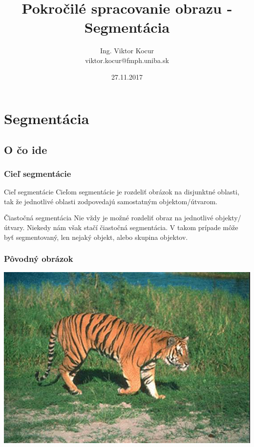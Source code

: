 \documentclass{beamer}
\title[10. cvičenie]{Pokročilé spracovanie obrazu - Segmentácia}
\author[Kocur]{Ing. Viktor Kocur \\{\small viktor.kocur@fmph.uniba.sk}}
\institute{DAI FMFI UK}
\date{27.11.2017}
\begin{document}


\begin{frame}

  \titlepage

\end{frame}

\section{Segmentácia}
\subsection{O čo ide}

\begin{frame}
\frametitle{Cieľ segmentácie}
\begin{block}{Cieľ segmentácie}
Cieľom segmentácie je rozdeliť obrázok na disjunktné oblasti, tak že jednotlivé oblasti zodpovedajú samostatným objektom/útvarom.
\end{block}

\begin{block}{Čiastočná segmentácia}
Nie vždy je možné rozdeliť obraz na jednotlivé objekty/útvary. Niekedy nám však stačí čiastočná segmentácia. V takom prípade môže byť segmentovaný, len nejaký objekt, alebo skupina objektov.
\end{block}
\end{frame}

\begin{frame}
\frametitle{Pôvodný obrázok}
\includegraphics[width=\textwidth]{tiger.png}
\end{frame}
\end{document}
